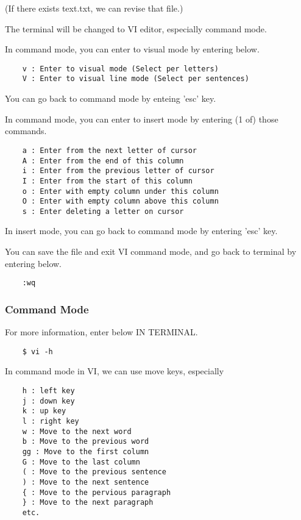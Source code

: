 (If there exists text.txt, we can revise that file.)

The terminal will be changed to VI editor, especially command mode.

In command mode, you can enter to visual mode by entering below.

\begin{verbatim}
    v : Enter to visual mode (Select per letters)
    V : Enter to visual line mode (Select per sentences)
\end{verbatim}

You can go back to command mode by enteing 'esc' key.

In command mode, you can enter to insert mode by entering (1 of) those commands.

\begin{verbatim}
    a : Enter from the next letter of cursor
    A : Enter from the end of this column
    i : Enter from the previous letter of cursor
    I : Enter from the start of this column
    o : Enter with empty column under this column
    O : Enter with empty column above this column
    s : Enter deleting a letter on cursor
\end{verbatim}

In insert mode, you can go back to command mode by entering 'esc' key.

You can save the file and exit VI command mode, and go back to terminal by entering below.

\begin{verbatim}
    :wq
\end{verbatim}

\subsubsection{Command Mode}

For more information, enter below IN TERMINAL.

\begin{verbatim}
    $ vi -h
\end{verbatim}

In command mode in VI, we can use move keys, especially

\begin{verbatim}
    h : left key
    j : down key
    k : up key
    l : right key
    w : Move to the next word
    b : Move to the previous word
    gg : Move to the first column
    G : Move to the last column
    ( : Move to the previous sentence
    ) : Move to the next sentence
    { : Move to the pervious paragraph
    } : Move to the next paragraph
    etc.
\end{verbatim}


